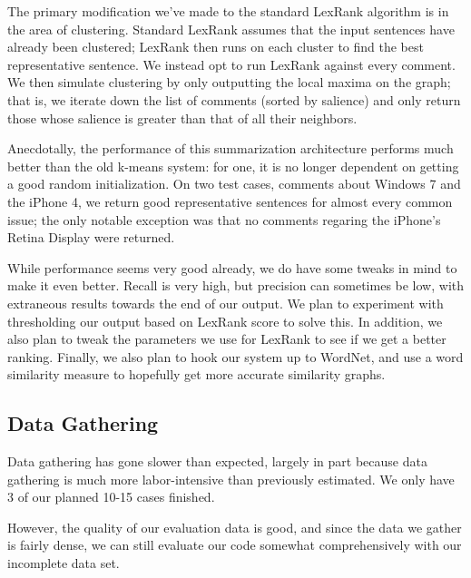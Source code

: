 \documentclass{article}
\begin{document}
The primary modification we've made to the standard LexRank
algorithm is in the area of clustering. Standard LexRank assumes
that the input sentences have already been clustered; LexRank then
runs on each cluster to find the best representative sentence. We
instead opt to run LexRank against every comment. We then simulate
clustering by only outputting the local maxima on the graph; that
is, we iterate down the list of comments (sorted by salience) and
only return those whose salience is greater than that of all their
neighbors.

Anecdotally, the performance of this summarization architecture
performs much better than the old k-means system: for one, it is no
longer dependent on getting a good random initialization. On two
test cases, comments about Windows 7 and the iPhone 4, we return
good representative sentences for almost every common issue; the
only notable exception was that no comments regaring the iPhone's
Retina Display were returned.

While performance seems very good already, we do have some tweaks
in mind to make it even better. Recall is very high, but precision
can sometimes be low, with extraneous results towards the end
of our output. We plan to experiment with thresholding our output
based on LexRank score to solve this. In addition, we also plan to
tweak the parameters we use for LexRank to see if we get a better
ranking. Finally, we also plan to hook our system up to WordNet,
and use a word similarity measure to hopefully get more accurate
similarity graphs.


\subsection{Data Gathering} %

Data gathering has gone slower than expected, largely in part
because data gathering is much more labor-intensive than previously
estimated. We only have 3 of our planned 10-15 cases finished.

However, the quality of our evaluation data is good, and since
the data we gather is fairly dense, we can still evaluate our code
somewhat comprehensively with our incomplete data set.




\tocsection


\end{document}
